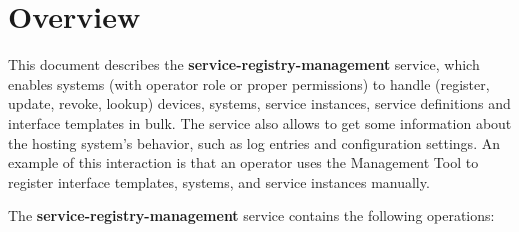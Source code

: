 \documentclass[a4paper]{arrowhead}
\begin{document}
\section{Overview}
\label{sec:overview}
This document describes the \textbf{service-registry-management} service, which enables systems (with operator role or proper permissions) to handle (register, update, revoke, lookup) devices, systems, service instances, service definitions and interface templates in bulk. The service also allows to get some information about the hosting system's behavior, such as log entries and configuration settings. An example of this interaction is that an operator uses the Management Tool to register interface templates, systems, and service instances manually.

The \textbf{service-registry-management} service contains the following operations:
\end{document}
